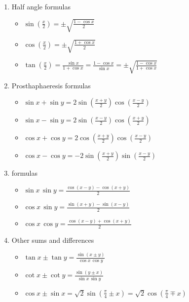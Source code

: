 \documentclass[12pt]{article}
\theoremstyle{definition}
\begin{document}
\begin{enumerate}
\item Half angle formulas

\begin{itemize}
\item $\displaystyle \sin\left(\frac{x}{2}\right) = \pm\sqrt{\frac{1-\cos{x}}{2}}$
\item $\displaystyle \cos\left(\frac{x}{2}\right) = \pm\sqrt{\frac{1+\cos{x}}{2}}$
\item $\displaystyle \tan\left(\frac{x}{2}\right) = \frac{\sin{x}}{1+\cos{x}} = \frac{1-\cos{x}}{\sin{x}} = \pm\sqrt{\frac{1-\cos{x}}{1+\cos{x}}}$
\end{itemize}

\item Prosthaphaeresis formulas

\begin{itemize}
\item $\displaystyle \sin{x}+\sin{y} = 2\sin\left(\frac{x+y}{2}\right)\cos\left(\frac{x-y}{2}\right)$
\item $\displaystyle \sin{x}-\sin{y} = 2\sin\left(\frac{x-y}{2}\right)\cos\left(\frac{x+y}{2}\right)$
\item $\displaystyle \cos{x}+\cos{y} = 2\cos\left(\frac{x+y}{2}\right)\cos\left(\frac{x-y}{2}\right)$
\item $\displaystyle \cos{x}-\cos{y} = -2\sin\left(\frac{x+y}{2}\right)\sin\left(\frac{x-y}{2}\right)$
\end{itemize}

\item {} formulas

\begin{itemize}
\item $\displaystyle \sin{x}\,\sin{y} = \frac{\cos(x-y)-\cos(x+y)}{2}$
\item $\displaystyle \cos{x}\,\sin{y} = \frac{\sin(x+y)-\sin(x-y)}{2}$
\item $\displaystyle \cos{x}\,\cos{y} = \frac{\cos(x-y)+\cos(x+y)}{2}$
\end{itemize}

\item Other sums and differences

\begin{itemize}
\item $\displaystyle \tan{x}\pm\tan{y} = \frac{\sin(x \pm y)}{\cos{x}\,\cos{y}}$
\item $\displaystyle \cot{x}\pm\cot{y} = \frac{\sin(y \pm x)}{\sin{x}\,\sin{y}}$
\item $\displaystyle \cos{x}\pm\sin{x} = \sqrt{2}\sin\!\left(\frac{\pi}{4}\pm x\right) =   \sqrt{2}\cos\!\left(\frac{\pi}{4}\mp x\right)$
\end{itemize}


\end{enumerate}
\end{document}
